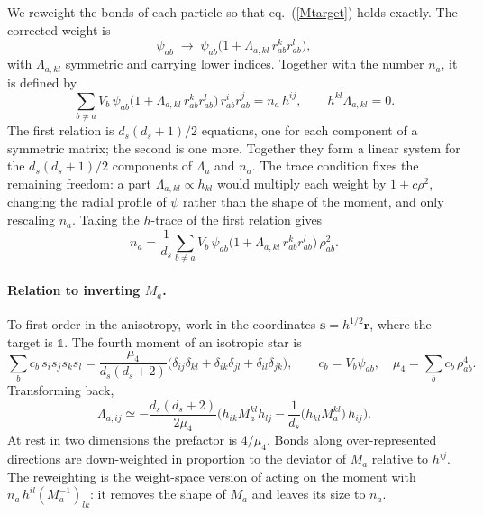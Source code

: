 \documentclass[11pt,aps,preprint,nofootinbib,superscriptaddress,tightenlines]{revtex4-2}
\def\st{\begin{equation}}
\def\stp{\end{equation}}
\def\Eq#1{eq.~(\ref{#1})}
\newcommand{\one}{\mathds{1}}
\let\oldparagraph\paragraph
\renewcommand{\paragraph}{\par\medskip\oldparagraph}
\begin{document}
We reweight the bonds of each particle so that \Eq{Mtarget} holds exactly.  The
corrected weight is
\st
\psi_{ab}\;\to\;\psi_{ab}\big(1+\Lambda_{a,kl}\,r^k_{ab}r^l_{ab}\big),
\stp
with $\Lambda_{a,kl}$ symmetric and carrying lower indices.  Together with the
number $n_a$, it is defined by
\st
\boxed{\;
\sum_{b\neq a}V_b\,\psi_{ab}\big(1+\Lambda_{a,kl}\,r^k_{ab}r^l_{ab}\big)\,r^i_{ab}r^j_{ab}=n_a\,h^{ij},
\qquad h^{kl}\Lambda_{a,kl}=0 .\;}
\label{Lambdadef}
\stp
The first relation is $d_s(d_s+1)/2$ equations, one for each component of a
symmetric matrix; the second is one more.  Together they form a linear system
for the $d_s(d_s+1)/2$ components of $\Lambda_a$ and $n_a$.  The trace condition fixes
the remaining freedom: a part $\Lambda_{a,kl}\propto h_{kl}$ would multiply each
weight by $1+c\rho^2$, changing the radial profile of $\psi$ rather than the shape
of the moment, and only rescaling $n_a$.  Taking the $h$-trace of the first
relation gives
\st
n_a=\frac1{d_s}\sum_{b\neq a}V_b\,\psi_{ab}\big(1+\Lambda_{a,kl}\,r^k_{ab}r^l_{ab}\big)\,\rho_{ab}^2 .
\stp

\paragraph{Relation to inverting $M_a$.}  To first order in the anisotropy, work
in the coordinates $\bm s=h^{1/2}\bm r$, where the target is $\one$.  The fourth moment of
an isotropic star is
\st
\sum_bc_b\,s_is_js_ks_l=\frac{\mu_4}{d_s(d_s+2)}\big(\delta_{ij}\delta_{kl}+\delta_{ik}\delta_{jl}+\delta_{il}\delta_{jk}\big),
\qquad c_b=V_b\psi_{ab},\quad \mu_4=\sum_bc_b\,\rho_{ab}^4 .
\stp
Transforming back,
\st
\Lambda_{a,ij}\simeq-\frac{d_s(d_s+2)}{2\mu_4}\Big(h_{ik}M_a^{kl}h_{lj}-\frac1{d_s}\big(h_{kl}M_a^{kl}\big)\,h_{ij}\Big).
\label{Lambdalin}
\stp
At rest in two dimensions the prefactor is $4/\mu_4$.  Bonds along
over-represented directions are down-weighted in proportion to the deviator of
$M_a$ relative to $h^{ij}$.  The reweighting is the weight-space version of
acting on the moment with $n_a\,h^{il}(M_a^{-1})_{lk}$: it removes the shape of $M_a$
and leaves its size to $n_a$.
\end{document}
